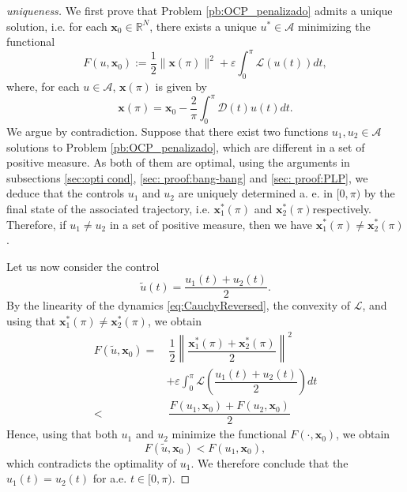 \documentclass[twocolumn]{autart}    %
\begin{document}
\begin{proof}[uniqueness]
We first prove that Problem \ref{pb:OCP_penalizado} admits a unique solution, i.e.  for each $\bm{x}_0\in \mathbb{R}^N$, there exists a unique $u^\ast\in \mathcal{A}$ minimizing the functional
\begin{equation}\label{eq:functional F}
F(u,\bm{x}_0) := \dfrac{1}{2} \| \bm{x}(\pi) \|^2 + \varepsilon \int_0^\pi \mathcal{L}(u(t)) dt,
\end{equation}
where,  for each $u\in \mathcal{A}$, $\bm{x}(\pi)$ is given by
$$
\bm{x} (\pi) = \bm{x}_0  - \dfrac{2}{\pi} \int_0^\pi \bm{\mathcal{D}}(t) u(t) dt.
$$
We argue by contradiction.
Suppose that there exist two functions $u_1,u_2\in\mathcal{A}$ solutions to Problem \ref{pb:OCP_penalizado}, which are different in a set of positive measure.
As both of them are optimal, using the arguments in subsections \ref{sec:opti cond}, \ref{sec: proof:bang-bang} and \ref{sec: proof:PLP}, we deduce that the controls $u_1$ and $u_2$ are uniquely determined a. e. in $[0,\pi)$ by the final state of the associated trajectory, i.e. $\bm{x}_1^\ast(\pi)$ and $\bm{x}_2^\ast(\pi)$respectively. Therefore,   if $u_1 \neq u_2$ in a set of positive measure, then we have $\bm{x}_1^\ast (\pi)\neq \bm{x}_2^\ast(\pi)$.

Let us now consider the control
$$
\tilde{u} (t) = \dfrac{u_1(t) + u_2(t)}{2}.
$$ 
By the linearity of the dynamics \eqref{eq:CauchyReversed}, the convexity of $\mathcal{L}$,  and using that $\bm{x}_1^\ast(\pi) \neq \bm{x}_2^\ast(\pi)$, we obtain
\begin{align*} 
F(\tilde{u}, \bm{x}_0) = & \ \dfrac{1}{2} \left\| \dfrac{\bm{x}_1^\ast(\pi) + \bm{x}_2^\ast(\pi) }{2}\right\|^2 \nonumber \\
&+ \varepsilon \int_0^\pi \mathcal{L} \left( \dfrac{u_1(t) + u_2(t) }{2}\right) dt \nonumber \\
< & \ \dfrac{F(u_1,\bm{x}_0) + F(u_2, \bm{x}_0)}{2} 
\end{align*}
Hence, using that both $u_1$ and $u_2$ minimize the functional $F(\cdot, \bm{x}_0)$, we obtain
$$
F(\tilde{u}, \bm{x}_0) < F(u_1,\bm{x}_0),
$$
which contradicts the optimality of $u_1$.
We therefore conclude that the $u_1 (t) =u_2(t)$ for a.e.  $t\in [0,\pi)$.
\end{proof}

\medskip
\end{document}
